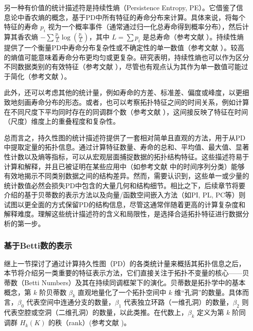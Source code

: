             另一种有价值的统计描述符是持续性熵（Persistence Entropy, PE）。它借鉴了信息论中香农熵的概念，基于PD中所有特征的寿命分布来计算。具体来说，将每个特征的寿命 $p_i$ 视为一个概率事件（通常通过归一化总寿命得到概率分布），然后计算其香农熵 $-\sum \frac{p_i}{L} \log(\frac{p_i}{L})$，其中 $L = \sum p_i$ 是总寿命（参考文献 \cite{source:59, source:287}）。持续性熵提供了一个衡量PD中寿命分布复杂性或不确定性的单一数值（参考文献 \cite{source:384, source:461}）。较高的熵值可能意味着寿命分布更均匀或更复杂。研究表明，持续性熵也可以作为区分不同数据类别的有效特征（参考文献 \cite{source:386}），尽管也有观点认为其作为单一数值可能过于简化（参考文献 \cite{source:88}）。
            
            此外，还可以考虑其他的统计量，例如寿命的方差、标准差、偏度或峰度，以更细致地刻画寿命分布的形态。或者，也可以考察拓扑特征之间的时间关系，例如计算在不同尺度下平均同时存在的同调群个数（参考文献 \cite{source:386, source:387}），这间接反映了特征在时间（尺度）维度上的重叠程度和复杂性。
            
            总而言之，持久性图的统计描述符提供了一套相对简单且直观的方法，用于从PD中提取定量的拓扑信息。通过计算特征数量、寿命的总和、平均值、最大值、显著性计数以及熵等指标，可以从宏观层面捕捉数据的拓扑结构特征。这些描述符易于计算和解释，并且已被证明在某些应用中（如参考文献 \cite{source:388} 中的时间序列分类）能够有效地揭示不同类别数据之间的结构差异。然而，需要认识到，这些单一或少量的统计数值必然会损失PD中包含的大量几何和结构细节。相比之下，后续章节将要介绍的基于贝蒂数的表示方法以及向量/函数空间嵌入方法（如PI, PL, PC等）则试图以更全面的方式保留PD的结构信息，尽管这通常伴随着更高的计算复杂度和解释难度。理解这些统计描述符的含义和局限性，是选择合适拓扑特征进行数据分析的第一步。
            
        \subsubsection{基于Betti数的表示}
            \label{sec:betti_features}
            继上一节探讨了通过计算持久性图（PD）的各类统计量来概括其拓扑信息之后，本节将介绍另一类重要的特征表示方法，它们直接关注于拓扑不变量的核心——贝蒂数（Betti Numbers）及其在持续同调框架下的演化。贝蒂数是拓扑学中的基本概念，第 $k$ 阶贝蒂数 $\beta_k$ 直观地量化了一个拓扑空间中 $k$ 维“孔洞”的数量。具体而言，$\beta_0$ 代表空间中连通分支的数量，$\beta_1$ 代表独立环路（一维孔洞）的数量，$\beta_2$ 则代表空腔或空洞（二维孔洞）的数量，以此类推。在代数上，$\beta_k$ 定义为第 $k$ 阶同调群 $H_k(K)$ 的秩（rank）(参考文献 \cite{source:48})。


